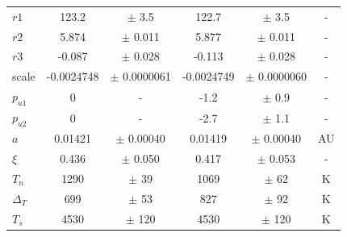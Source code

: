 \documentclass[a4paper,fleqn,usenatbib]{mnras}
\begin{document}
\begin{center}
\begin{table}
{\begin{center}
\begin{tabular}{l c c c c c}
$r1$ &        123.2 & $\pm$         3.5 &        122.7 & $\pm$         3.5 & -\\
$r2$ &        5.874 & $\pm$       0.011 &        5.877 & $\pm$       0.011 & -\\
$r3$ &       -0.087 & $\pm$       0.028 &       -0.113 & $\pm$       0.028 & -\\
scale &   -0.0024748 & $\pm$   0.0000061 &   -0.0024749 & $\pm$   0.0000060 & -\\
$p_{u1}$ & 0 & - &         -1.2 & $\pm$         0.9 & -\\
$p_{u2}$ & 0 & - &         -2.7 & $\pm$         1.1 & -\\
$a$ &      0.01421 & $\pm$     0.00040 &      0.01419 & $\pm$     0.00040 & AU\\
$\xi$ &        0.436 & $\pm$       0.050 &        0.417 & $\pm$       0.053 & -\\
$T_n$ &         1290 & $\pm$          39 &         1069 & $\pm$          62 & K\\
$\Delta_T$ &          699 & $\pm$          53 &          827 & $\pm$          92 & K\\
$T_s$ &         4530 & $\pm$         120 &         4530 & $\pm$         120 & K\\
\end{tabular}
\end{center}
\label{tab:results}
}
\end{table}
\end{center}
\end{document}
